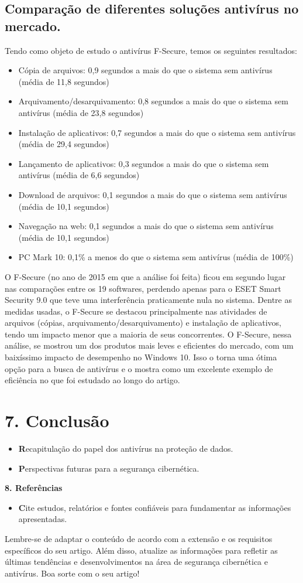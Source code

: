 \documentclass[10pt,conference,twocolumn]{article}
\begin{document}
\subsection* {Comparação de diferentes soluções antivírus no mercado.}
Tendo como objeto de estudo o antivírus F-Secure, temos os seguintes resultados:
\begin{itemize}
\item
Cópia de arquivos: 0,9 segundos a mais do que o sistema sem antivírus (média de 11,8 segundos)
\item
Arquivamento/desarquivamento: 0,8 segundos a mais do que o sistema sem antivírus (média de 23,8 segundos)
\item
Instalação de aplicativos: 0,7 segundos a mais do que o sistema sem antivírus (média de 29,4 segundos)
\item
Lançamento de aplicativos: 0,3 segundos a mais do que o sistema sem antivírus (média de 6,6 segundos)
\item
Download de arquivos: 0,1 segundos a mais do que o sistema sem antivírus (média de 10,1 segundos)
\item
Navegação na web: 0,1 segundos a mais do que o sistema sem antivírus (média de 10,1 segundos)
\item
PC Mark 10: 0,1\% a menos do que o sistema sem antivírus (média de 100\%)
\end{itemize}
O F-Secure (no ano  de 2015 em que a análise foi feita) ficou em segundo lugar nas comparações entre os 19 softwares, perdendo apenas para o ESET Smart Security 9.0 que teve uma interferência praticamente nula no sistema.
Dentre as medidas usadas, o F-Secure se destacou principalmente nas atividades de arquivos (cópias, arquivamento/desarquivamento) e instalação de aplicativos, tendo um impacto menor que a maioria de seus concorrentes.
O F-Secure, nessa análise, se mostrou um dos produtos mais leves e eficientes do mercado, com um baixíssimo impacto de desempenho no Windows 10. Isso o torna uma ótima opção para a busca de antivírus e o mostra como um excelente exemplo de eficiência no que foi estudado ao longo do artigo.


\section* {7. Conclusão}
 \begin{itemize}
\item \textbf Recapitulação do papel dos antivírus na proteção de dados.
\item \textbf Perspectivas futuras para a segurança cibernética.
\end{itemize}

\textbf {8. Referências}
 \begin{itemize}
\item \textbf Cite estudos, relatórios e fontes confiáveis para fundamentar as informações apresentadas.
\end{itemize}

Lembre-se de adaptar o conteúdo de acordo com a extensão e os requisitos específicos do seu artigo. Além disso, atualize as informações para refletir as últimas tendências e desenvolvimentos na área de segurança cibernética e antivírus. Boa sorte com o seu artigo!
\end{document}

